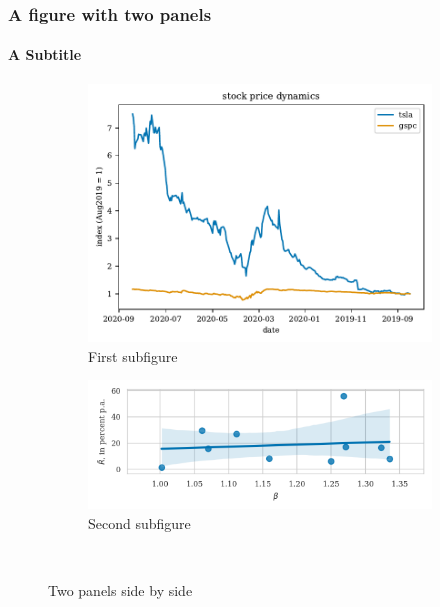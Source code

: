 \documentclass{beamer}
\begin{document}
\begin{frame}
    \frametitle{A figure with two panels}
    \framesubtitle{A Subtitle}
    \begin{figure}
    \centering
      \begin{subfigure}{0.45\textwidth}
        \centering
        \includegraphics[width=\textwidth]{stock-index-weird-plot}
        \caption{First subfigure}
        \label{fig:a}
      \end{subfigure}\hfill
      \begin{subfigure}{0.45\textwidth}
        \centering
        \includegraphics[width=\textwidth]{beta-vs-mu}
        \caption{Second subfigure}
        \label{fig:b}
      \end{subfigure}\\
    \caption{Two panels side by side}\label{fig:stock-beta-comparison}
    \end{figure}
\end{frame}
\end{document}
